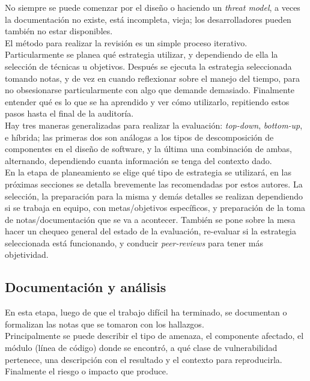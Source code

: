 No siempre se puede comenzar por el diseño o haciendo un \textit{threat model}, a veces la documentación no existe, está incompleta, vieja; los desarrolladores pueden también no estar disponibles.\\

El método para realizar la revisión es un simple proceso iterativo. Particularmente se planea qué estrategia utilizar, y dependiendo de ella la selección de técnicas u objetivos. Después se ejecuta la estrategia seleccionada tomando notas, y de vez en cuando reflexionar sobre el manejo del tiempo, para no obsesionarse particularmente con algo que demande demasiado. Finalmente entender qué es lo que se ha aprendido y ver cómo utilizarlo, repitiendo estos pasos hasta el final de la auditoría.\\

Hay tres maneras generalizadas para realizar la evaluación: \textit{top-down}, \textit{bottom-up}, e híbrida; las primeras dos son análogas a los tipos de descomposición de componentes en el diseño de software, y la última una combinación de ambas, alternando, dependiendo cuanta información se tenga del contexto dado.\\

En la etapa de planeamiento se elige qué tipo de estrategia se utilizará, en las próximas secciones se detalla brevemente las recomendadas por estos autores. La selección, la preparación para la misma y demás detalles se realizan dependiendo si se trabaja en equipo, con metas/objetivos específicos, y preparación de la toma de notas/documentación que se va a acontecer. También se pone sobre la mesa hacer un chequeo general del estado de la evaluación, re-evaluar si la estrategia seleccionada está funcionando, y conducir \textit{peer-reviews} para tener más objetividad.

\subsection{Documentación y análisis}
En esta etapa, luego de que el trabajo difícil ha terminado, se documentan o formalizan las notas que se tomaron con los hallazgos. \\

Principalmente se puede describir el tipo de amenaza, el componente afectado, el módulo (línea de código) donde se encontró, a qué clase de vulnerabilidad pertenece, una descripción con el resultado y el contexto para reproducirla. Finalmente el riesgo o impacto que produce.\\


